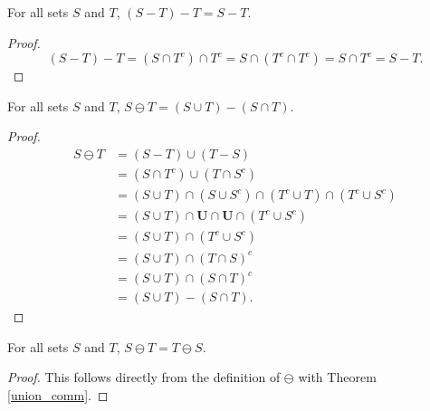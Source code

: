 \documentclass[../../math.tex]{subfiles}
\begin{document}
\begin{theorem}
    For all sets $S$ and $T$, $(S - T) - T = S - T$.
\end{theorem}
\begin{proof}
    \[
        (S - T) - T = (S \cap T^c) \cap T^c = S \cap (T^c \cap T^c) = S \cap T^c
        = S - T.
    \]
\end{proof}

\begin{theorem}
    For all sets $S$ and $T$, $S \ominus T = (S \cup T) - (S \cap T)$.
\end{theorem}
\begin{proof}
    \begin{align*}
        S \ominus T
        &= (S - T) \cup (T - S) \\
        &= (S \cap T^c) \cup (T \cap S^c) \\
        &= (S \cup T) \cap (S \cup S^c) \cap (T^c \cup T) \cap (T^c \cup S^c) \\
        &= (S \cup T) \cap \bm U \cap \bm U \cap (T^c \cup S^c) \\
        &= (S \cup T) \cap (T^c \cup S^c) \\
        &= (S \cup T) \cap (T \cap S)^c \\
        &= (S \cup T) \cap (S \cap T)^c \\
        &= (S \cup T) - (S \cap T).
    \end{align*}
\end{proof}

\begin{theorem}
    For all sets $S$ and $T$, $S \ominus T = T \ominus S$.
\end{theorem}
\begin{proof}
    This follows directly from the definition of $\ominus$ with Theorem
    \ref{union_comm}.
\end{proof}
\end{document}
